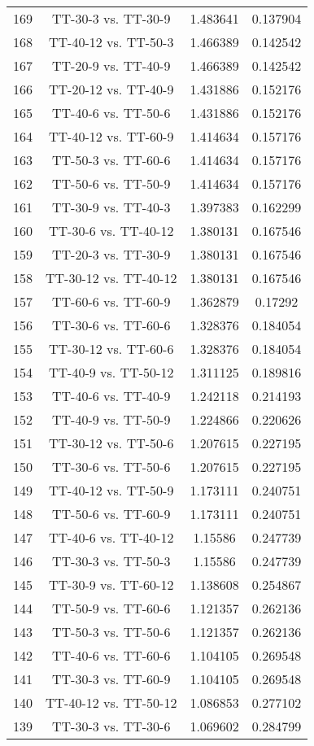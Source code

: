 \documentclass[a4paper,10pt]{article}
\begin{document}
\begin{landscape}
\begin{table}[!htp]
\begin{tabular}{cccc}
169&TT-30-3 vs. TT-30-9&1.483641&0.137904\\
168&TT-40-12 vs. TT-50-3&1.466389&0.142542\\
167&TT-20-9 vs. TT-40-9&1.466389&0.142542\\
166&TT-20-12 vs. TT-40-9&1.431886&0.152176\\
165&TT-40-6 vs. TT-50-6&1.431886&0.152176\\
164&TT-40-12 vs. TT-60-9&1.414634&0.157176\\
163&TT-50-3 vs. TT-60-6&1.414634&0.157176\\
162&TT-50-6 vs. TT-50-9&1.414634&0.157176\\
161&TT-30-9 vs. TT-40-3&1.397383&0.162299\\
160&TT-30-6 vs. TT-40-12&1.380131&0.167546\\
159&TT-20-3 vs. TT-30-9&1.380131&0.167546\\
158&TT-30-12 vs. TT-40-12&1.380131&0.167546\\
157&TT-60-6 vs. TT-60-9&1.362879&0.17292\\
156&TT-30-6 vs. TT-60-6&1.328376&0.184054\\
155&TT-30-12 vs. TT-60-6&1.328376&0.184054\\
154&TT-40-9 vs. TT-50-12&1.311125&0.189816\\
153&TT-40-6 vs. TT-40-9&1.242118&0.214193\\
152&TT-40-9 vs. TT-50-9&1.224866&0.220626\\
151&TT-30-12 vs. TT-50-6&1.207615&0.227195\\
150&TT-30-6 vs. TT-50-6&1.207615&0.227195\\
149&TT-40-12 vs. TT-50-9&1.173111&0.240751\\
148&TT-50-6 vs. TT-60-9&1.173111&0.240751\\
147&TT-40-6 vs. TT-40-12&1.15586&0.247739\\
146&TT-30-3 vs. TT-50-3&1.15586&0.247739\\
145&TT-30-9 vs. TT-60-12&1.138608&0.254867\\
144&TT-50-9 vs. TT-60-6&1.121357&0.262136\\
143&TT-50-3 vs. TT-50-6&1.121357&0.262136\\
142&TT-40-6 vs. TT-60-6&1.104105&0.269548\\
141&TT-30-3 vs. TT-60-9&1.104105&0.269548\\
140&TT-40-12 vs. TT-50-12&1.086853&0.277102\\
139&TT-30-3 vs. TT-30-6&1.069602&0.284799\\

\end{tabular}
\end{table}
\end{landscape}
\end{document}
